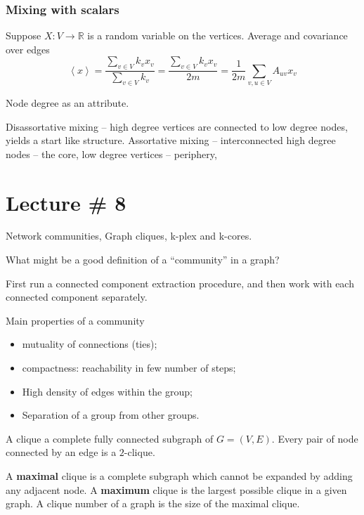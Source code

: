 \documentclass[a4paper]{article}
\newcommand{\brkt}[1]{{\left\langle #1 \right\rangle}}
\newcommand{\Real}{\mathbb{R}}
\begin{document}
\subsubsection{Mixing with scalars} %
\label{ssub:mixing_with_scalars}

Suppose $X:V\to \Real$ is a random variable on the vertices. Average and covariance over edges
\[\brkt{x} = \frac{\sum_{v\in V}k_v x_v}{\sum_{v\in V}k_v} = \frac{\sum_{v\in V}k_v x_v}{2m} = \frac{1}{2m}\sum_{v,u\in V}A_{uv} x_v\]


Node degree as an attribute.

Disassortative mixing -- high degree vertices are connected to low degree nodes, yields a start like structure.
Assortative mixing -- interconnected high degree nodes -- the core, low degree vertices -- periphery,



\section{Lecture \# 8} %
\label{sec:lecture_8}

Network communities, Graph cliques, k-plex and k-cores.

What might be a good definition of a ``community'' in a graph?

First run a connected component extraction procedure, and then work with each connected component separately.

Main properties of a community \begin{itemize}
	\item mutuality of connections (ties);
	\item compactness: reachability in few number of steps;
	\item High density of edges within the group;
	\item Separation of a group from other groups.
\end{itemize}

A clique a complete fully connected subgraph of $G = (V,E)$.
Every pair of node connected by an edge is a $2$-clique.

A \textbf{maximal} clique is a complete subgraph which cannot be expanded by adding any adjacent node. A \textbf{maximum} clique is the largest possible clique in a given graph. A clique number of a graph is the size of the maximal clique.
\end{document}
